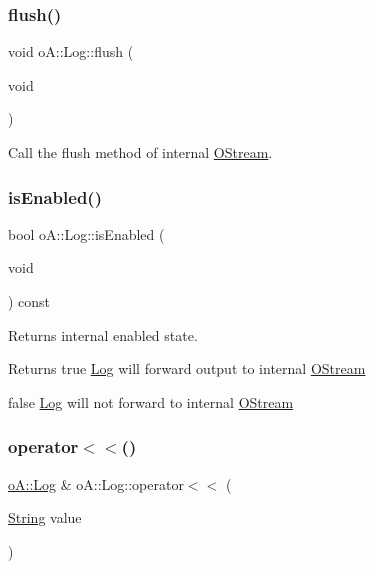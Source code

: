 \subsubsection{\texorpdfstring{flush()}{flush()}}
{\footnotesize\ttfamily void o\+A\+::\+Log\+::flush (\begin{DoxyParamCaption}\item[{void}]{ }\end{DoxyParamCaption})\hspace{0.3cm}{\ttfamily [noexcept]}}



Call the flush method of internal \mbox{\hyperlink{namespaceo_a_ab69b2110953f22401259db9c6ddc7905}{O\+Stream}}. 

\mbox{\label{classo_a_1_1_log_ada21589725c48f82d05893e5936522ea}} 
\subsubsection{\texorpdfstring{is\+Enabled()}{isEnabled()}}
{\footnotesize\ttfamily bool o\+A\+::\+Log\+::is\+Enabled (\begin{DoxyParamCaption}\item[{void}]{ }\end{DoxyParamCaption}) const\hspace{0.3cm}{\ttfamily [noexcept]}}



Returns internal enabled state. 

\begin{DoxyReturn}{Returns}
true \mbox{\hyperlink{classo_a_1_1_log}{Log}} will forward output to internal \mbox{\hyperlink{namespaceo_a_ab69b2110953f22401259db9c6ddc7905}{O\+Stream}} 

false \mbox{\hyperlink{classo_a_1_1_log}{Log}} will not forward to internal \mbox{\hyperlink{namespaceo_a_ab69b2110953f22401259db9c6ddc7905}{O\+Stream}} 
\end{DoxyReturn}
\mbox{\label{classo_a_1_1_log_acfa81696d9db53900bb4d03f278024ee}} 
\subsubsection{\texorpdfstring{operator$<$$<$()}{operator<<()}\hspace{0.1cm}{\footnotesize\ttfamily [1/9]}}
{\footnotesize\ttfamily \mbox{\hyperlink{classo_a_1_1_log}{o\+A\+::\+Log}} \& o\+A\+::\+Log\+::operator$<$$<$ (\begin{DoxyParamCaption}\item[{\mbox{\hyperlink{classo_a_1_1_string}{String}}}]{value }\end{DoxyParamCaption})}


